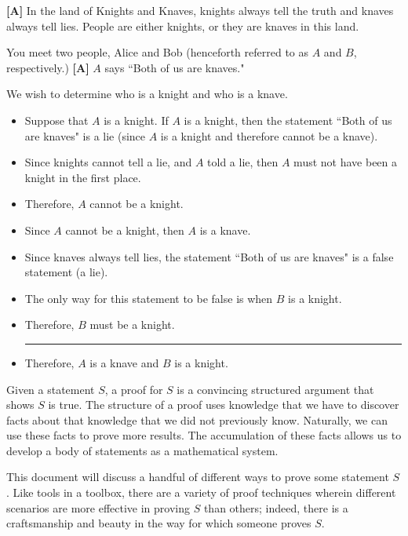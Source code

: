 \documentclass[../proofs.tex]{subfiles}
\newcommand{\hrulesmall}{\rule{0.4\textwidth}{1pt}}
\newcommand{\assump}{\textbf{[A]}}
\newcommand{\deduct}{\textbf{[D]}}
\begin{document}
\begin{expl}{}
\assump{} In the land of Knights and Knaves, knights always tell the truth and
knaves always tell lies. People are either knights, or they are knaves in this
land.

You meet two people, Alice and Bob (henceforth referred to as $A$ and $B$,
respectively.) \assump{} $A$ says ``Both of us are knaves."

We wish to determine who is a knight and who is a knave.

\begin{itemize}
  \item[\deduct] Suppose that $A$ is a knight. If $A$ is a knight, then the
        statement ``Both of us are knaves" is a lie (since $A$ is a knight and
        therefore cannot be a knave).
  \item[\deduct] Since knights cannot tell a lie, and $A$ told a lie, then $A$
        must not have been a knight in the first place.
  \item[\deduct] Therefore, $A$ cannot be a knight.
  \item[\deduct] Since $A$ cannot be a knight, then $A$ is a knave.
  \item[\deduct] Since knaves always tell lies, the statement ``Both of us are
        knaves" is a false statement (a lie).
  \item[\deduct] The only way for this statement to be false is when $B$ is a
       knight.
  \item[\deduct] Therefore, $B$ must be a knight. \newline \hrulesmall
  \item[\deduct] Therefore, $A$ is a knave and $B$ is a knight.
\end{itemize}
\end{expl}

Given a statement $S$, a proof for $S$ is a convincing structured argument that
shows $S$ is true. The structure of a proof uses knowledge that we have to
discover facts about that knowledge that we did not previously know. Naturally,
we can use these facts to prove more results. The accumulation of these facts
allows us to develop a body of statements as a mathematical system.


This document will discuss a handful of different ways to prove some statement
$S$. Like tools in a toolbox, there are a variety of proof techniques wherein
different scenarios are more effective in proving $S$ than others; indeed, there
is a craftsmanship and beauty in the way for which someone proves $S$.
\end{document}
